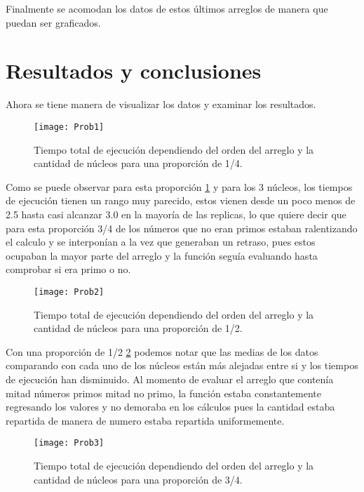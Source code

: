 \documentclass{article}
\begin{document}
Finalmente se acomodan los datos de estos últimos arreglos de manera que puedan ser graficados.



\section{Resultados y conclusiones}

Ahora se tiene manera de visualizar los datos y examinar los resultados.


\begin{figure}[H]
\begin{center}
\texttt{[image: Prob1]}
\caption{Tiempo total de ejecución dependiendo del orden del arreglo y la cantidad de núcleos para una proporción de 1/4.}
\label{g1}
\end{center}
\end{figure}
Como se puede observar para esta proporción \ref{g1} y para los 3 núcleos, los tiempos de ejecución tienen un rango muy parecido, estos vienen desde un poco menos de 2.5 hasta casi alcanzar 3.0 en la mayoría de las replicas, lo que quiere decir que para esta proporción 3/4 de los números que no eran primos estaban ralentizando el calculo y se interponían a la vez que generaban un retraso, pues estos ocupaban la mayor parte del arreglo y la función seguía evaluando hasta comprobar si era primo o no.

\begin{figure}[H]
\begin{center}
\texttt{[image: Prob2]}
\caption{Tiempo total de ejecución dependiendo del orden del arreglo y la cantidad de núcleos para una proporción de 1/2.}
\label{g2}
\end{center}
\end{figure}
Con una proporción de 1/2 \ref{g2} podemos notar que las medias de los datos comparando con cada uno de los núcleos están más alejadas entre si y los tiempos de ejecución han disminuido. Al momento de evaluar el arreglo que contenía mitad números primos mitad no primo, la función estaba constantemente regresando los valores y no demoraba en los cálculos pues la cantidad estaba repartida de manera de numero estaba repartida uniformemente.

\begin{figure}[H]
\begin{center}
\texttt{[image: Prob3]}
\caption{Tiempo total de ejecución dependiendo del orden del arreglo y la cantidad de núcleos para una proporción de 3/4.}
\label{g3}
\end{center}
\end{figure}
\end{document}
